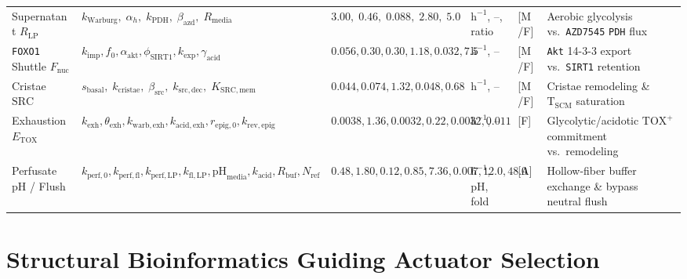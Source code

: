 \documentclass[11pt]{article}
\theoremstyle{plain}
\theoremstyle{remark}
\begin{document}
\begin{table}[t]
{\begin{tabular}{@{}llllll@{}}
Supernatant $R_{\mathrm{LP}}$ & $k_{\mathrm{Warburg}},\; \alpha_h,\; k_{\mathrm{PDH}},\; \beta_{\mathrm{azd}},\; R_{\mathrm{media}}$ & $3.00,\; 0.46,\; 0.088,\; 2.80,\; 5.0$ & $\text{h}^{-1}$, --, ratio & [M/F] & Aerobic glycolysis vs.\ \texttt{AZD7545} \texttt{PDH} flux \cite{kato2007pdk1} \\
\texttt{FOXO1} Shuttle $F_{\mathrm{nuc}}$ & $k_{\mathrm{imp}}, f_0, \alpha_{\mathrm{akt}}, \phi_{\mathrm{SIRT1}}, k_{\mathrm{exp}}, \gamma_{\mathrm{acid}}$ & $0.056, 0.30, 0.30, 1.18, 0.032, 7.5$ & $\text{h}^{-1}$, -- & [M/F] & \texttt{Akt} 14-3-3 export vs.\ \texttt{SIRT1} retention \cite{doan2024foxo1,chan2024foxo1} \\
Cristae $\mathrm{SRC}$ & $s_{\mathrm{basal}},\; k_{\mathrm{cristae}},\; \beta_{\mathrm{src}},\; k_{\mathrm{src,dec}},\; K_{\mathrm{SRC,mem}}$ & $0.044, 0.074, 1.32, 0.048, 0.68$ & $\text{h}^{-1}$, -- & [M/F] & Cristae remodeling \& $\mathrm{T}_{\mathrm{SCM}}$ saturation \cite{buck2016mitochondrial} \\
Exhaustion $E_{\mathrm{TOX}}$ & $k_{\mathrm{exh}}, \theta_{\mathrm{exh}}, k_{\mathrm{warb,exh}}, k_{\mathrm{acid,exh}}, r_{\mathrm{epig},0}, k_{\mathrm{rev,epig}}$ & $0.0038, 1.36, 0.0032, 0.22, 0.0032, 0.011$ & $\text{h}^{-1}$, -- & [F] & Glycolytic/acidotic $\text{TOX}^+$ commitment vs.\ remodeling \cite{pauken2016epigenetic} \\
Perfusate $\mathrm{pH}$ / Flush & $k_{\mathrm{perf},0}, k_{\mathrm{perf,fl}}, k_{\mathrm{perf,LP}}, k_{\mathrm{fl,LP}}, \mathrm{pH}_{\mathrm{media}}, k_{\mathrm{acid}}, R_{\mathrm{buf}}, N_{\mathrm{ref}}$ & $0.48, 1.80, 0.12, 0.85, 7.36, 0.007, 12.0, 48.0$ & $\text{h}^{-1}$, pH, fold & [A] & Hollow-fiber buffer exchange \& bypass neutral flush \\
\bottomrule
\end{tabular}%
}
\end{table}

\section{Structural Bioinformatics Guiding Actuator Selection}
\label{sec:structural}
\end{document}
